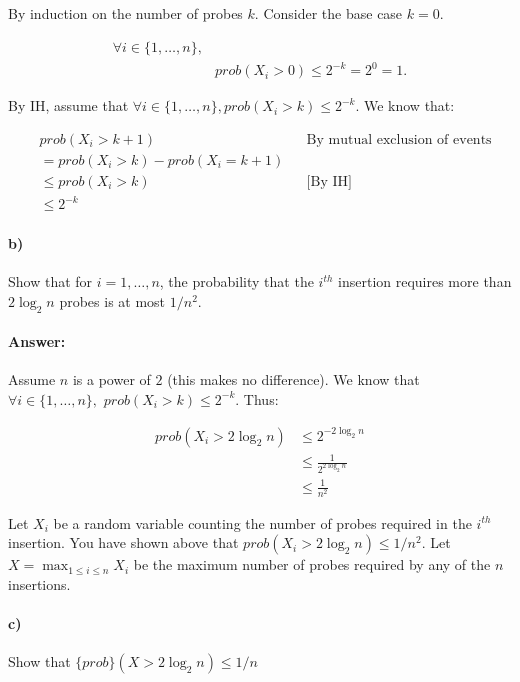 \documentclass[a4paper]{article}
\begin{document}
By induction on the number of probes $k$. Consider the base case $k=0$.


\begin{align*}
\forall i \in \{1, \ldots, n\}, \\
& {prob}(X_i > 0) \le 2^{-k} = 2^0 = 1.
\end{align*}

By IH, assume that $\forall i \in \{1, \ldots, n\}, {prob}(X_i > k) \le 2^{-k}$. We know that:

\begin{align*}
& {prob}(X_i > k+1) && \text{By mutual exclusion of events} \\
& = {prob}(X_i > k) - {prob}(X_i = k+1) \\
& \le {prob}(X_i > k) && \text{[By IH]} \\
& \le 2^{-k}
\end{align*}

\paragraph{b)} Show that for $i = 1, \ldots, n$, the probability that the $i^{th}$ insertion requires more than $2 \log_2 n$ probes is at most $1/n^2$.

\paragraph{Answer:}

Assume $n$ is a power of $2$ (this makes no difference). We know that $\forall i \in \{1, \ldots, n\},$
${prob}(X_i > k) \le 2^{-k}$. Thus:

\begin{align*}
{prob}(X_i > 2 \log_2 n) & \le 2^{-2\log_2 n} \\
& \le \frac{1}{2^{2 \log_2 n}} \\
& \le \frac{1}{n^2}
\end{align*}


\noindent Let $X_i$ be a random variable counting the number of probes required in the $i^{th}$ insertion. You have shown above that ${prob}(X_i > 2 \log_2 n) \le 1/n^2$. Let $X = \max_{1 \le i \le n} X_i$ be the maximum number of probes required by any of the $n$ insertions.


\paragraph{c)} Show that $\{prob\}(X > 2 \log_2 n) \le 1/n$
\end{document}
